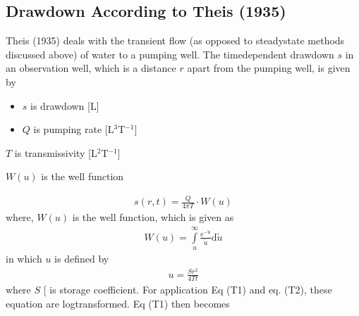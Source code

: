 \documentclass[letterpaper,10pt,english]{jupyterBook}
\begin{document}
\subsection{Drawdown According to Theis (1935)}
\label{\detokenize{content/flow/L8/18_wells:drawdown-according-to-theis-1935}}
\sphinxAtStartPar
Theis (1935) deals with the transient flow (as opposed to steady\sphinxhyphen{}state methods discussed above) of water to a pumping well. The time\sphinxhyphen{}dependent drawdown \(s\) in an observation well, which is a distance \(r\) apart from the pumping well, is given by

\begin{sphinxShadowBox}
\sphinxstylesidebartitle{}
\begin{itemize}
\item {} 
\sphinxAtStartPar
\(s\) is drawdown {[}L{]}

\end{itemize}
\begin{itemize}
\item {} 
\sphinxAtStartPar
\(Q\) is pumping rate {[}L\(^3\)T\(^{-1}\){]}

\end{itemize}

\sphinxAtStartPar
\(T\) is transmissivity {[}L\(^2\)T\(^{-1}\){]}

\sphinxAtStartPar
\(W(u)\) is the well function
\end{sphinxShadowBox}
\begin{equation*}
\begin{split}
s(r,t) = \frac{Q}{4\pi T}\cdot W(u) \tag{T1}
\end{split}
\end{equation*}
\sphinxAtStartPar
where, \(W(u)\) is the well function, which is given as
\begin{equation*}
\begin{split}
W(u) = \int\limits_u^\infty \frac{\textrm{e}^{-\widetilde{u}}}{\widetilde{u}}\textrm{d}\widetilde{u}
\end{split}
\end{equation*}
\sphinxAtStartPar
in which \(u\) is defined by
\begin{equation*}
\begin{split}
u = \frac{Sr^2}{4Tt} \tag{T2}
\end{split}
\end{equation*}
\sphinxAtStartPar
where \(S\) {[}\sphinxhyphen{}{]} is storage coefficient. For application Eq (T1) and eq. (T2), these equation are log\sphinxhyphen{}transformed. Eq (T1) then becomes
\end{document}

